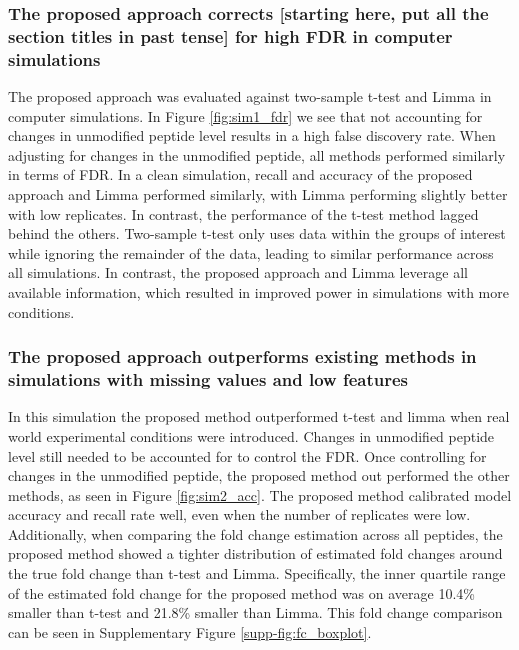 \documentclass[mcp]{article}
\numberwithin{table}{section}
\def\todo#1{{\color{red}[#1]}}
\begin{document}
\subsubsection*{The proposed approach corrects \todo{starting here, put all the section titles in past tense} for high FDR in computer simulations}

The proposed approach was evaluated against two-sample t-test and Limma in computer simulations. 
In Figure \ref{fig:sim1_fdr} we see that not accounting for changes in unmodified peptide level results in a high false discovery rate. When adjusting for changes in the unmodified peptide, all methods performed similarly in terms of FDR. In a clean simulation, recall and accuracy of the proposed approach and Limma performed similarly, with Limma performing slightly better with low replicates. In contrast, the performance of the t-test method lagged behind the others. Two-sample t-test only uses data within the groups of interest while ignoring the remainder of the data, leading to similar performance across all simulations. In contrast, the proposed approach and Limma leverage all available information, which resulted in improved power in simulations with more conditions.

\subsubsection*{The proposed approach outperforms existing methods in simulations with missing values and low features}

In this simulation the proposed method outperformed t-test and limma when real world experimental conditions were introduced. Changes in unmodified peptide level still needed to be accounted for to control the FDR. Once controlling for changes in the unmodified peptide, the proposed method out performed the other methods, as seen in Figure \ref{fig:sim2_acc}. The proposed method calibrated model accuracy and recall rate well, even when the number of replicates were low. Additionally, when comparing the fold change estimation across all peptides, the proposed method showed a tighter distribution of estimated fold changes around the true fold change than t-test and Limma. Specifically, the inner quartile range of the estimated fold change for the proposed method was on average 10.4\% smaller than t-test and 21.8\% smaller than Limma. This fold change comparison can be seen in Supplementary Figure \ref{supp-fig:fc_boxplot}.
\end{document}
